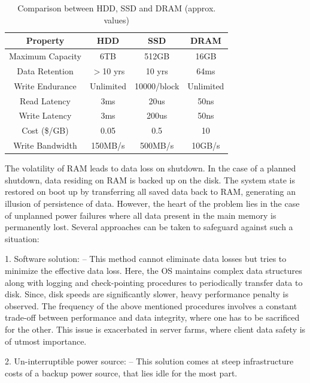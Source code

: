 \setlength{\belowcaptionskip}{-10pt}

\begin{table}[H]
  \centering
  \caption[Comparison between HDD, SSD and DRAM]{Comparison between HDD, SSD and DRAM (approx. values)}
  \label{tab:sdd_ram_comp}
  \begin{tabular}{|c|c|c|c|}
      \hline
      Property & HDD & SSD & DRAM \\
      \hline
      Maximum Capacity  & 6TB  & 512GB &  16GB\\
      \hline
      Data Retention &  $>$10 yrs &  10 yrs &  64ms  \\
      \hline
      Write Endurance &  Unlimited &  10000/block &  Unlimited \\
      \hline
      Read Latency & 3ms & 20us & 50ns     \\
      \hline
      Write Latency & 3ms & 200us & 50ns   \\
      \hline
      Cost (\$/GB) & 0.05 & 0.5 & 10        \\
      \hline
      Write Bandwidth & 150MB/s & 500MB/s & 10GB/s  \\
      \hline
  \end{tabular}
\end{table}
The volatility of RAM leads to data loss on shutdown. In the case of a planned shutdown, data residing on RAM is backed up on the disk. The system state is restored on boot up by transferring all saved data back to RAM, generating an illusion of persistence of data. However, the heart of the problem lies in the case of unplanned power failures where all data present in the main memory is permanently lost. Several approaches can be taken to safeguard against such a situation:

1. Software solution: -- This method cannot eliminate data losses but tries to minimize the effective data loss. Here, the OS maintains complex data structures along with logging and check-pointing procedures to periodically transfer data to disk. Since, disk speeds are significantly slower, heavy performance penalty is observed. The frequency of the above mentioned procedures involves a constant trade-off between performance and data integrity, where one has to be sacrificed for the other. This issue is exacerbated in server farms, where client data safety is of utmost importance.

2. Un-interruptible power source: -- This solution comes at steep infrastructure costs of a backup power source, that lies idle for the most part.

